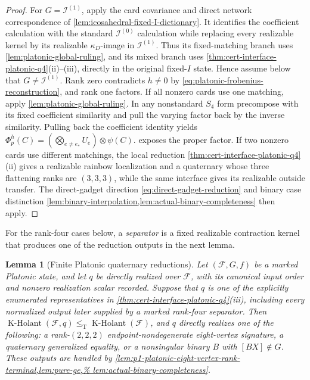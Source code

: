 \documentclass[11pt,letterpaper,onecolumn]{article}
\theoremstyle{plain}
\newtheorem{lemma}[lemma]{Lemma}
\theoremstyle{definition}
\theoremstyle{remark}
\newcommand{\cF}{\mathcal F}
\newcommand{\KHolant}{\operatorname{K\text{-}Holant}}
\newcommand{\IcoZero}{{\mathcal I^{(0)}}}
\newcommand{\IcoOne}{{\mathcal I^{(1)}}}
\newcommand{\leT}{\leq_{\mathrm T}}
\begin{document}
\begin{proof}
For \(G=\IcoOne\), apply the card covariance and direct network
correspondence of \cref{lem:icosahedral-fixed-I-dictionary}.  It identifies the
coefficient calculation with the standard \(\IcoZero\) calculation while
replacing every realizable kernel by its realizable \(\kappa_D\)-image in
\(\IcoOne\).  Thus its fixed-matching branch uses
\cref{lem:platonic-global-ruling}, and its mixed branch uses
\cref{thm:cert-interface-platonic-q4}\textnormal{(ii)--(iii)}, directly in
the original fixed-\(I\) state.  Hence assume below that
\(G\ne\IcoOne\).
Rank zero contradicts \(h\ne0\) by
\cref{eq:platonic-frobenius-reconstruction}, and rank one factors.  If all nonzero cards
use one matching, apply \cref{lem:platonic-global-ruling}. In any
nonstandard \(S_4\) form precompose with its fixed coefficient similarity
and pull the varying factor back by the inverse similarity.  Pulling back the coefficient identity yields
\(\Phi_p^h(C)=(\bigotimes_{e\ne e_*}U_e)\otimes\psi(C)\).
 exposes the proper factor.  If two nonzero cards use different matchings, the
local reduction \cref{thm:cert-interface-platonic-q4}\textnormal{(ii)} gives a realizable rainbow localization and a quaternary whose three
flattening ranks are \((3,3,3)\), while
the same interface gives its realizable outside transfer.
The direct-gadget direction \cref{eq:direct-gadget-reduction} and binary case distinction \cref{lem:binary-interpolation,lem:actual-binary-completeness} then
apply.
\end{proof}

For the rank-four cases below, a \emph{separator} is a fixed realizable
contraction kernel that produces one of the reduction outputs in the
next lemma.

\begin{lemma}[Finite Platonic quaternary reductions]
\label{lem:platonic-finite-q4-terminal}
Let \((\cF,G,f)\) be a marked Platonic state, and let \(q\) be directly
realized over \(\cF\), with its canonical input order and nonzero realization scalar recorded.  Suppose that \(q\) is one
of the explicitly enumerated representatives in
\cref{thm:cert-interface-platonic-q4}\textnormal{(iii)}, including every normalized output later
supplied by a marked rank-four separator.  Then
\(\KHolant(\cF,q)\leT\KHolant(\cF)\), and \(q\) directly realizes
one of the following: a rank-\((2,2,2)\) endpoint-nondegenerate
eight-vertex signature, a quaternary generalized equality, or a
nonsingular binary \(B\) with \([BX]\notin G\).
These outputs are handled by
\cref{lem:p1-platonic-eight-vertex-rank-terminal,lem:pure-ge,%
lem:actual-binary-completeness}.
\end{lemma}
\end{document}
